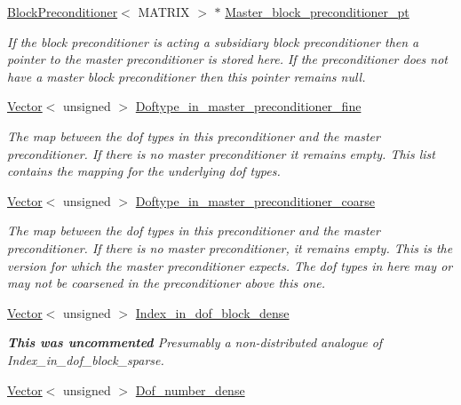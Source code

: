 \begin{DoxyCompactItemize}
\hyperlink{classoomph_1_1BlockPreconditioner}{Block\+Preconditioner}$<$ M\+A\+T\+R\+IX $>$ $\ast$ \hyperlink{classoomph_1_1BlockPreconditioner_a7759d79eefa52fb688caac08a4ff4894}{Master\+\_\+block\+\_\+preconditioner\+\_\+pt}
\begin{DoxyCompactList}\small\item\em If the block preconditioner is acting a subsidiary block preconditioner then a pointer to the master preconditioner is stored here. If the preconditioner does not have a master block preconditioner then this pointer remains null. \end{DoxyCompactList}\item 
\hyperlink{classoomph_1_1Vector}{Vector}$<$ unsigned $>$ \hyperlink{classoomph_1_1BlockPreconditioner_ae8c06ce4f4baf8480a2f25b152031dad}{Doftype\+\_\+in\+\_\+master\+\_\+preconditioner\+\_\+fine}
\begin{DoxyCompactList}\small\item\em The map between the dof types in this preconditioner and the master preconditioner. If there is no master preconditioner it remains empty. This list contains the mapping for the underlying dof types. \end{DoxyCompactList}\item 
\hyperlink{classoomph_1_1Vector}{Vector}$<$ unsigned $>$ \hyperlink{classoomph_1_1BlockPreconditioner_a2d341eaf3312c7afcd663c7f4eba6fc2}{Doftype\+\_\+in\+\_\+master\+\_\+preconditioner\+\_\+coarse}
\begin{DoxyCompactList}\small\item\em The map between the dof types in this preconditioner and the master preconditioner. If there is no master preconditioner, it remains empty. This is the version for which the master preconditioner expects. The dof types in here may or may not be coarsened in the preconditioner above this one. \end{DoxyCompactList}\item 
\hyperlink{classoomph_1_1Vector}{Vector}$<$ unsigned $>$ \hyperlink{classoomph_1_1BlockPreconditioner_a0ad82070ce2f6cdfa9ea6c7226ea28af}{Index\+\_\+in\+\_\+dof\+\_\+block\+\_\+dense}
\begin{DoxyCompactList}\small\item\em {\bfseries This was uncommented} Presumably a non-\/distributed analogue of Index\+\_\+in\+\_\+dof\+\_\+block\+\_\+sparse. \end{DoxyCompactList}\item 
\hyperlink{classoomph_1_1Vector}{Vector}$<$ unsigned $>$ \hyperlink{classoomph_1_1BlockPreconditioner_a37b22a0a25030a4b08f2eaec261ae22b}{Dof\+\_\+number\+\_\+dense}

\end{DoxyCompactItemize}
